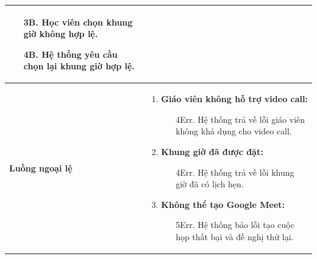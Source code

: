 {\begin{tabularx}{\textwidth}{|>{\raggedright\arraybackslash}X|>{\raggedright\arraybackslash}X|}
\begin{enumerate}
    \begin{enumerate}
        \item[3B.] Học viên chọn khung giờ không hợp lệ.
        \item[4B.] Hệ thống yêu cầu chọn lại khung giờ hợp lệ.
    \end{enumerate}
\end{enumerate} \\
\hline
\textbf{Luồng ngoại lệ} &
\begin{enumerate}
    \item \textbf{Giáo viên không hỗ trợ video call:}
    \begin{enumerate}
        \item[4Err.] Hệ thống trả về lỗi giáo viên không khả dụng cho video call.
    \end{enumerate}
    \item \textbf{Khung giờ đã được đặt:}
    \begin{enumerate}
        \item[4Err.] Hệ thống trả về lỗi khung giờ đã có lịch hẹn.
    \end{enumerate}
    \item \textbf{Không thể tạo Google Meet:}
    \begin{enumerate}
        \item[5Err.] Hệ thống báo lỗi tạo cuộc họp thất bại và đề nghị thử lại.
    \end{enumerate}
\end{enumerate} \\
\hline
\end{tabularx}
}
